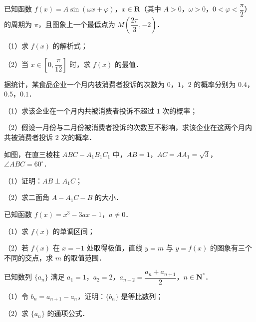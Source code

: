 \begin{question}
已知函数 $f(x)=A\sin(\omega x+\varphi)$，$x\in\mathbf R$（其中 $A>0$，$\omega>0$，$0<\varphi<\dfrac\pi2$）的周期为 $\pi$，且图象上一个最低点为 $M\left(\dfrac{2\pi}3,-2\right)$．

（1）求 $f(x)$ 的解析式；

（2）当 $x\in\left[0,\dfrac\pi{12}\right]$ 时，求 $f(x)$ 的最值．

\end{question}
\begingroup
\renewenvironment{question}{\Needspace{0.5\textheight}}{}
\begin{question}
据统计，某食品企业一个月内被消费者投诉的次数为 $0$，$1$，$2$ 的概率分别为 $0.4$，$0.5$，$0.1$．

（1）求该企业在一个月内共被消费者投诉不超过 $1$ 次的概率；

（2）假设一月份与二月份被消费者投诉的次数互不影响，求该企业在这两个月内共被消费者投诉 $2$ 次的概率．

\Needspace{0.4\textheight}
\end{question}
\endgroup
\begin{question}
如图，在直三棱柱 $ABC-A_1B_1C_1$ 中，$AB=1$，$AC=AA_1=\sqrt3$，$\angle ABC=60^\circ$．

（1）证明：$AB\perp A_1C$；

（2）求二面角 $A-A_1C-B$ 的大小．
\nopagebreak[4]
\begin{center}\end{center}
\nopagebreak[4]
\end{question}
\begin{question}
已知函数 $f(x)=x^3-3ax-1$，$a\neq0$．

（1）求 $f(x)$ 的单调区间；

（2）若 $f(x)$ 在 $x=-1$ 处取得极值，直线 $y=m$ 与 $y=f(x)$ 的图象有三个不同的交点，求 $m$ 的取值范围．

\end{question}
\begin{question}
已知数列 $\{a_n\}$ 满足 $a_1=1$，$a_2=2$，$a_{n+2}=\dfrac{a_n+a_{n+1}}2$，$n\in\mathbf N^*$．

（1）令 $b_n=a_{n+1}-a_n$，证明：$\{b_n\}$ 是等比数列；

（2）求 $\{a_n\}$ 的通项公式．

\Needspace{0.4\textheight}
\end{question}
\begingroup
\renewenvironment{question}{\Needspace{0.5\textheight}}{}
